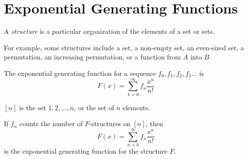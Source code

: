 


\section{Exponential Generating Functions}

\begin{definition}
    A \emph{structure} is a particular organization of the elements
     of a set or sets.
\end{definition}
For example, some structures include a set, a non-empty set, 
an even-sized set, a permutation, an increasing permutation, 
or a function from $A$ into $B$
\begin{definition}
    The exponential generating function for a sequence 
    $f_{0}, f_{1}, f_{2}, f_{3} \ldots$ is
\[
    F(x)=\sum_{k=0}^{\infty} f_{n} \frac{x^{n}}{n !}
\]
\end{definition}
\begin{definition}
    $[n]$ is the set $1,2, \ldots, n$, or the set of $n$ elements.
\end{definition}
\begin{theorem}
    If $f_{n}$ counts the number of $F$-structures on $[n]$, then
\[
    F(x)=\sum_{n=0}^{\infty} f_{n} \frac{x^{n}}{n !}
\]
is the exponential generating function for the structure $F$.
\end{theorem}

